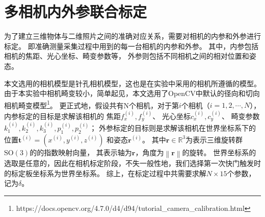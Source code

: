 \section{多相机内外参联合标定}
\label{sec:camera_calib}

为了建立三维物体与二维照片之间的准确对应关系，需要对相机的内参和外参进行标定。
即准确测量采集过程中用到的每一台相机的内参和外参。
其中，内参包括相机的焦距、光心坐标、畸变参数等，
外参则包括不同相机之间的相对位置和姿态。

本文选用的相机模型是针孔相机模型，这也是在实验中采用的相机所遵循的模型。
由于本实验中相机畸变较小，简单起见，本文选用了OpenCV中默认的径向和切向相机畸变模型\footnote{https://docs.opencv.org/4.7.0/d4/d94/tutorial\_camera\_calibration.html}。
更正式地，假设共有N个相机，对于第$i$个相机（$i=1,2,\cdots,N$），
内参标定的目标是求解该相机的
焦距$f_x^{(i)},f_y^{(i)}$、
光心坐标$c_x^{(i)},c_y^{(i)}$、
畸变参数$k_1^{(i)},k_2^{(i)},k_3^{(i)},p_1^{(i)},p_2^{(i)}$；
外参标定的目标则是求解该相机在世界坐标系下的
位置$\mathbf{t}^{(i)}=\left(x^{(i)},y^{(i)},z^{(i)}\right)$
和姿态$\mathbf{r}^{(i)}$。
其中$\mathbf{r}\in \mathbb{R}^3$为表示三维旋转群$\mathrm{SO(3)}$的的指数映射向量，
其表示轴为$\mathbf{r}$，角度为$\left\| \mathbf{r}\right\|$的旋转。
世界坐标系的选取是任意的，因此在相机标定阶段，不失一般性地，我们选择第一次快门触发时的标定板坐标系为世界坐标系。
综上，在标定过程中共需要求解$N\times 15$个参数，记为$\delta$。

